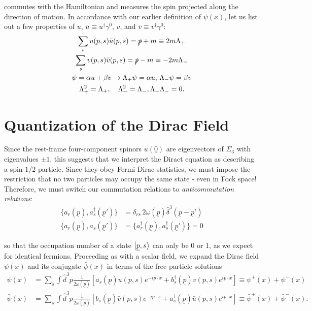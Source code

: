 \documentclass{article}
\numberwithin{equation}{section}
\begin{document}
commutes with the Hamiltonian and measures the spin projected along the direction of motion. In accordance with our earlier definition of $\bar{\psi}(x)$, let us list out a few properties of $u$, $\bar{u} \equiv u^\dagger \gamma^0$, $v$, and $\bar{v} \equiv v^\dagger \gamma^0$:
\begin{gather}
    \sum_s u(p, s) \bar{u} (p, s) = \slashed{p} + m \equiv 2m\Lambda_+ \\
    \sum_s v(p, s) \bar{v} (p, s) = \slashed{p} - m \equiv -2m \Lambda_- \\
    \psi = \alpha u + \beta v \rightarrow \Lambda_+ \psi = \alpha u, \, \Lambda_- \psi = \beta v \\
    \Lambda_+^2 = \Lambda_+, \quad \Lambda_-^2 = \Lambda_-, \Lambda_+ \Lambda_- = 0.
\end{gather}

\section{Quantization of the Dirac Field}

Since the rest-frame four-component spinors $u(\underline{0})$ are eigenvectors of $\Sigma_3$ with eigenvalues $\pm 1$, this suggests that we interpret the Diract equation as describing a spin-$1/2$ particle. Since they obey Fermi-Dirac statistics, we must impose the restriction that no two particles may occupy the same state - even in Fock space! Therefore, we must switch our commutation relations to \textit{anticommutation relations}:
\begin{equation}
\begin{aligned}
    \{a_r(\underline{p}), a_s^\dagger(\underline{p}')\} &= \delta_{rs}\, 2 \omega(\underline{p}) \hat{\delta}^3(\underline{p}-\underline{p}') \\
    \{a_r(\underline{p}), a_s(\underline{p}')\} &= \{a_r^\dagger(\underline{p}), a_s^\dagger(\underline{p}')\} = 0
\end{aligned}
\end{equation}

so that the occupation number of a state $\ket{\underline{p}, s}$ can only be 0 or 1, as we expect for identical fermions. Proceeding as with a scalar field, we expand the Dirac field $\psi(x)$ and its conjugate $\bar{\psi}(x)$ in terms of the free particle solutions
\begin{equation}
\begin{aligned}
    \psi(x) &= \sum_s \int \hat{d}^3 p \frac{1}{2\omega(\underline{p})} \left[a_s(\underline{p})u(p, s) e^{-ip\cdot x} + b_s^\dagger(\underline{p}) v(p, s) e^{ip\cdot x}\right] \equiv \psi^+(x) + \psi^-(x) \\
    \bar{\psi}(x) &= \sum_s \int \hat{d}^3 p \frac{1}{2\omega(\underline{p})} \left[b_s(\underline{p}) \bar{v}(p, s) e^{-ip\cdot x} + a_s^\dagger(\underline{p}) \bar{u}(p, s) e^{ip\cdot x}  \right] \equiv \bar{\psi}^+(x) + \bar{\psi}^-(x).
\end{aligned}
\end{equation}
\end{document}
